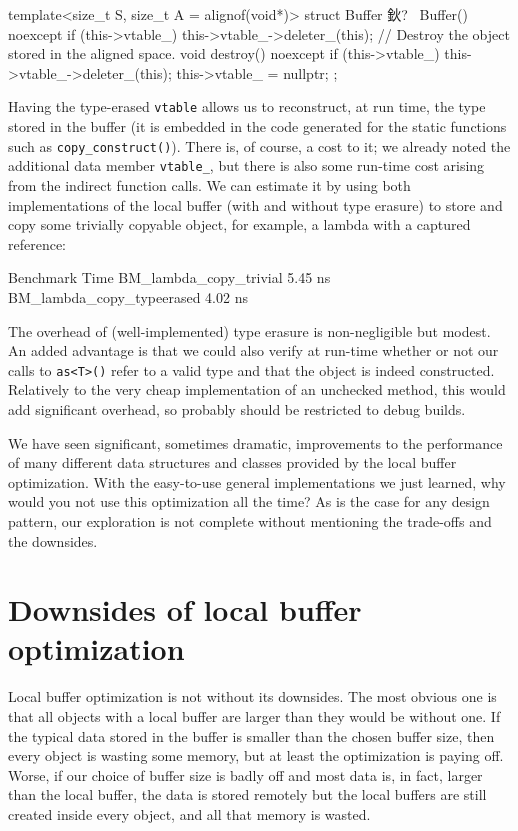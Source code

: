 \begin{code}
template<size_t S, size_t A = alignof(void*)>
struct Buffer {
  鈥?
  ~Buffer() noexcept {
    if (this->vtable_) this->vtable_->deleter_(this);
  }
  // Destroy the object stored in the aligned space.
  void destroy() noexcept {
    if (this->vtable_) this->vtable_->deleter_(this);
    this->vtable_ = nullptr;
  }
};
\end{code}

Having the type-erased \texttt{vtable} allows us to reconstruct, at run time, the type stored in the buffer (it is embedded in the code generated for the static functions such as \texttt{copy\_construct()}). There is, of course, a cost to it; we already noted the additional data member \texttt{vtable\_}, but there is also some run-time cost arising from the indirect function calls. We can estimate it by using both implementations of the local buffer (with and without type erasure) to store and copy some trivially copyable object, for example, a lambda with a captured reference:

\begin{code}
Benchmark                        Time
BM_lambda_copy_trivial          5.45 ns
BM_lambda_copy_typeerased       4.02 ns
\end{code}

The overhead of (well-implemented) type erasure is non-negligible but modest. An added advantage is that we could also verify at run-time whether or not our calls to \texttt{as\textless{}T\textgreater{}()} refer to a valid type and that the object is indeed constructed. Relatively to the very cheap implementation of an unchecked method, this would add significant overhead, so probably should be restricted to debug builds.

We have seen significant, sometimes dramatic, improvements to the performance of many different data structures and classes provided by the local buffer optimization. With the easy-to-use general implementations we just learned, why would you not use this optimization all the time? As is the case for any design pattern, our exploration is not complete without mentioning the trade-offs and the downsides.

\section{Downsides of local buffer optimization}

Local buffer optimization is not without its downsides. The most obvious one is that all objects with a local buffer are larger than they would be without one. If the typical data stored in the buffer is smaller than the chosen buffer size, then every object is wasting some memory, but at least the optimization is paying off. Worse, if our choice of buffer size is badly off and most data is, in fact, larger than the local buffer, the data is stored remotely but the local buffers are still created inside every object, and all that memory is wasted.

